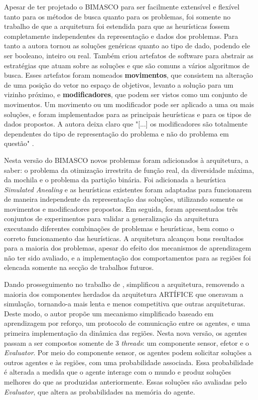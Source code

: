 Apesar de  ter projetado o BIMASCO para ser facilmente extensível e flexível tanto para os métodos de busca quanto para os problemas, foi somente no trabalho de  que a arquitetura foi estendida para que as heurísticas fossem completamente independentes da representação e dados dos problemas. Para tanto a autora tornou as soluções genéricas quanto ao tipo de dado, podendo ele ser booleano, inteiro ou real. Também criou artefatos de software para abstrair as estratégias que atuam sobre as soluções e que são comuns a vários algoritmos de busca. Esses artefatos foram nomeados \textbf{movimentos}, que consistem na alteração de uma posição do vetor no espaço de objetivos, levanto a solução para um vizinho próximo, e  \textbf{modificadores}, que podem ser vistos como um conjunto de movimentos. Um movimento ou um modificador pode ser aplicado a uma ou mais soluções, e foram implementados para as principais heurísticas e para os tipos de dados propostos. A autora deixa claro que "[...]  os modificadores são totalmente dependentes do tipo de
representação do problema e não do problema em questão" \cite{denise2014}. 

Nesta versão do BIMASCO novos problemas foram adicionados à arquitetura, a saber: o problema da otimização irrestrita de função real,  da diversidade máxima, da mochila e o problema da partição binária. Foi adicionada a heurística \textit{Simulated Anealing} e as heurísticas existentes foram adaptadas para funcionarem de maneira independente da representação das soluções, utilizando somente os movimentos e modificadores propostos. Em seguida, foram apresentados três conjuntos de experimentos para validar a generalização da arquitetura executando diferentes combinações de problemas e heurísticas, bem como o correto funcionamento das heurísticas. A arquitetura alcançou bons resultados para a maioria dos problemas, apesar do efeito dos mecanismos de aprendizagem não ter sido avaliado, e a implementação dos comportamentos para as regiões foi elencada somente na secção de trabalhos futuros. 

Dando prosseguimento no trabalho de ,  simplificou a arquitetura, removendo a maioria dos componentes herdados da arquitetura ARTÍFICE que oneravam a simulação, tornando-a mais lenta e menos competitiva que outras arquiteturas. Deste modo, o autor propõe um mecanismo simplificado baseado em aprendizagem  por reforço, um protocolo de comunicação entre os agentes, e uma primeira implementação da dinâmica das regiões. Nesta nova versão, os agentes passam a ser compostos somente de 3 \textit{threads}: um componente sensor, efetor e o \textit{Evaluator}. Por meio do componente sensor, os agentes podem solicitar soluções a outros agentes e às regiões, com uma probabilidade associada. Essa probabilidade é alterada a medida que o agente interage com o mundo e produz soluções melhores do que as produzidas anteriormente. Essas soluções são avaliadas pelo \textit{Evaluator}, que altera as probabilidades na memória do agente. 

